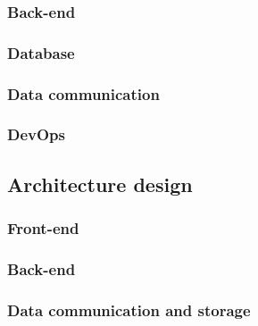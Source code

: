 \documentclass[]{article}
\begin{document}
\subsubsection{Back-end}
            
\subsubsection{Database}

\subsubsection{Data communication}
            
\subsubsection{DevOps}

\pagebreak

\subsection{Architecture design}

\pagebreak
\subsubsection{Front-end}

\pagebreak
\subsubsection{Back-end}

\pagebreak
\subsubsection{Data communication and storage}

\pagebreak

% 
\end{document}
